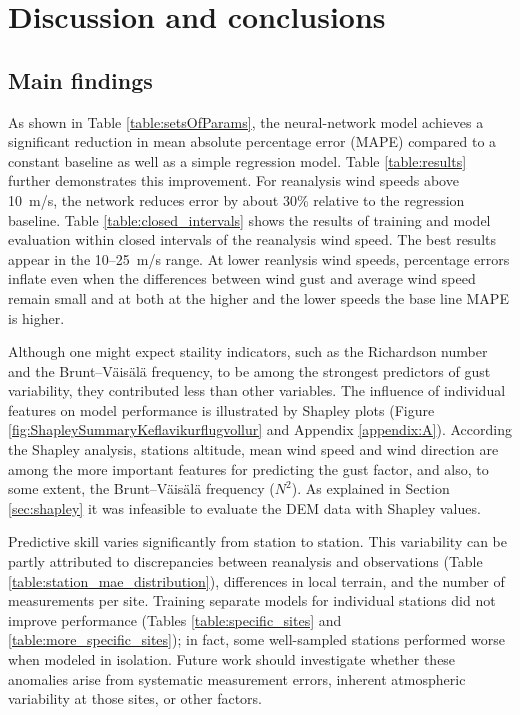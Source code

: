 \chapter{Discussion and conclusions}
\label{Chapter5}

\section{Main findings}
As shown in Table \ref{table:setsOfParams}, the neural-network model achieves a significant reduction in mean absolute percentage error (MAPE) compared to a constant baseline as well as a simple regression model. Table \ref{table:results} further demonstrates this improvement. For reanalysis wind speeds above 10~m/s, the network reduces error by about 30\% relative to the regression baseline. Table \ref{table:closed_intervals} shows the results of training and model evaluation within closed intervals of the reanalysis wind speed. The best results appear in the 10--25~m/s range. At lower reanlysis wind speeds, percentage errors inflate even when the differences between wind gust and average wind speed remain small and at both at the higher and the lower speeds the base line MAPE is higher.

Although one might expect staility indicators, such as the Richardson number and the Brunt--Väisälä frequency, to be among the strongest predictors of gust variability, they contributed less than other variables. The influence of individual features on model performance is illustrated by Shapley plots (Figure \ref{fig:ShapleySummaryKeflavikurflugvollur} and Appendix \ref{appendix:A}). According the Shapley analysis, stations altitude, mean wind speed and wind direction are among the more important features for predicting the gust factor, and also, to some extent, the Brunt--Väisälä frequency ($N^2$). As explained in Section \ref{sec:shapley} it was infeasible to evaluate the DEM data with Shapley values.

Predictive skill varies significantly from station to station. This variability can be partly attributed to discrepancies between reanalysis and observations (Table \ref{table:station_mae_distribution}), differences in local terrain, and the number of measurements per site. Training separate models for individual stations did not improve performance (Tables \ref{table:specific_sites} and \ref{table:more_specific_sites}); in fact, some well-sampled stations performed worse when modeled in isolation. Future work should investigate whether these anomalies arise from systematic measurement errors, inherent atmospheric variability at those sites, or other factors.

